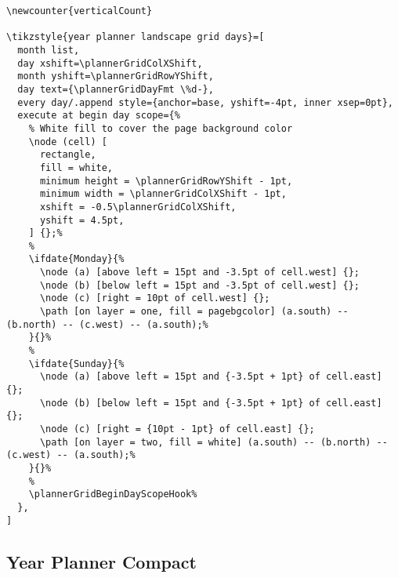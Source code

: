 \documentclass[11pt,oneside]{memoir-article}
\begin{document}
\begin{verbatim}
\newcounter{verticalCount}

\tikzstyle{year planner landscape grid days}=[
  month list,
  day xshift=\plannerGridColXShift,
  month yshift=\plannerGridRowYShift,
  day text={\plannerGridDayFmt \%d-},
  every day/.append style={anchor=base, yshift=-4pt, inner xsep=0pt},
  execute at begin day scope={%
    % White fill to cover the page background color
    \node (cell) [
      rectangle,
      fill = white,
      minimum height = \plannerGridRowYShift - 1pt,
      minimum width = \plannerGridColXShift - 1pt,
      xshift = -0.5\plannerGridColXShift,
      yshift = 4.5pt,
    ] {};%
    %
    \ifdate{Monday}{%
      \node (a) [above left = 15pt and -3.5pt of cell.west] {};
      \node (b) [below left = 15pt and -3.5pt of cell.west] {};
      \node (c) [right = 10pt of cell.west] {};
      \path [on layer = one, fill = pagebgcolor] (a.south) -- (b.north) -- (c.west) -- (a.south);%
    }{}%
    %
    \ifdate{Sunday}{%
      \node (a) [above left = 15pt and {-3.5pt + 1pt} of cell.east] {};
      \node (b) [below left = 15pt and {-3.5pt + 1pt} of cell.east] {};
      \node (c) [right = {10pt - 1pt} of cell.east] {};
      \path [on layer = two, fill = white] (a.south) -- (b.north) -- (c.west) -- (a.south);%
    }{}%
    %
    \plannerGridBeginDayScopeHook%
  },
]
\end{verbatim}

\subsection{Year Planner Compact}
\label{sec:org03a177d}
\end{document}
